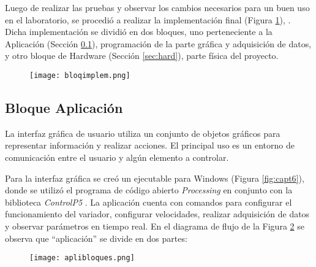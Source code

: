 Luego de realizar las pruebas y observar los cambios necesarios para un buen uso en el laboratorio, se procedió a realizar la implementación final (Figura \ref{fig:implebloq}), . Dicha implementación se dividió en dos bloques, uno perteneciente a la Aplicación (Sección \ref{sec:aplic}), programación de la parte gráfica y adquisición de datos, y otro bloque de Hardware (Sección \ref{sec:hard}), parte física del proyecto. 


\begin{figure}[h!]
	\centering
	\texttt{[image: bloqimplem.png]}
	\label{fig:implebloq}
\end{figure}





\subsection{Bloque Aplicación} 	\label{sec:aplic}
\begin{tcolorbox}[colback=blue!5!white,colframe=blue!75!black,title=GUI]
	La interfaz gráfica de usuario utiliza un conjunto de objetos gráficos para representar información y realizar acciones. El principal uso es un entorno de comunicación entre el usuario y algún elemento a controlar.
\end{tcolorbox}

Para la interfaz gráfica se creó un ejecutable para Windows (Figura \ref{fig:capt6}), donde se utilizó el programa de código abierto \textit{Processing} en conjunto con la biblioteca \textit{ControlP5} \cite{controlp5}. La aplicación cuenta con comandos para configurar el funcionamiento del variador, configurar velocidades, realizar adquisición de datos y observar parámetros en tiempo real.
En el diagrama de flujo de la Figura \ref{fig:bloqvis} se observa que “aplicación” se divide en dos partes: 

\begin{figure}[H]
	\centering
	\texttt{[image: aplibloques.png]}
	\label{fig:bloqvis}
\end{figure}

